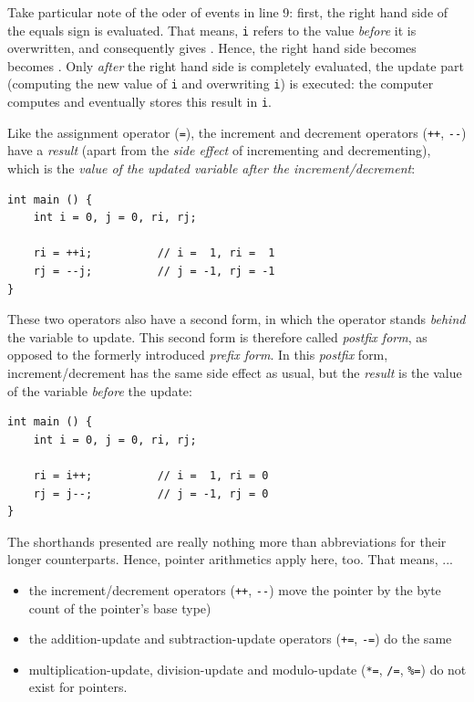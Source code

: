 {{{{Take particular note of the oder of events in line 9: first, the right hand side of the equals sign is evaluated. That means, \texttt{i} refers to the value \emph{before} it is overwritten, and consequently gives . Hence, the right hand side  becomes  becomes . Only \emph{after} the right hand side is completely evaluated, the update part (computing the new value of \texttt{i} and overwriting \texttt{i}) is executed: the computer computes  and eventually stores this result in \texttt{i}.

Like the assignment operator (\texttt{=}), the increment and decrement operators (\texttt{++}, \texttt{-{}-}) have a \emph{result} (apart from the \emph{side effect} of incrementing and decrementing), which is the \emph{value of the updated variable after the increment/decrement}:
\begin{codebox}[prefixShorthand.c]
\begin{verbatim}
int main () {
    int i = 0, j = 0, ri, rj;
   
    ri = ++i;          // i =  1, ri =  1
    rj = --j;          // j = -1, rj = -1
}
\end{verbatim}
\end{codebox}

These two operators also have a second form, in which the operator stands \emph{behind} the variable to update. This second form is therefore called \emph{postfix form}, as opposed to the formerly introduced \emph{prefix form}. In this \emph{postfix} form, increment/decrement has the same side effect as usual, but the \emph{result} is the value of the variable \emph{before} the update:
\begin{codebox}[postfixShorthand.c]
\begin{verbatim}
int main () {
    int i = 0, j = 0, ri, rj;
   
    ri = i++;          // i =  1, ri = 0
    rj = j--;          // j = -1, rj = 0
}
\end{verbatim}
\end{codebox}

\begin{hintbox}
The shorthands presented are really nothing more than abbreviations for their longer counterparts. Hence, pointer arithmetics apply here, too. That means, ...
\begin{itemize}
\item the increment/decrement operators (\texttt{++}, \texttt{-{}-}) move the pointer by the byte count of the pointer's base type)
\item the addition-update and subtraction-update operators (\texttt{+=}, \texttt{-=}) do the same
\item multiplication-update, division-update and modulo-update (\texttt{*=}, \texttt{/=}, \texttt{\%=}) do not exist for pointers.
\end{itemize}
\end{hintbox}

}}}}

